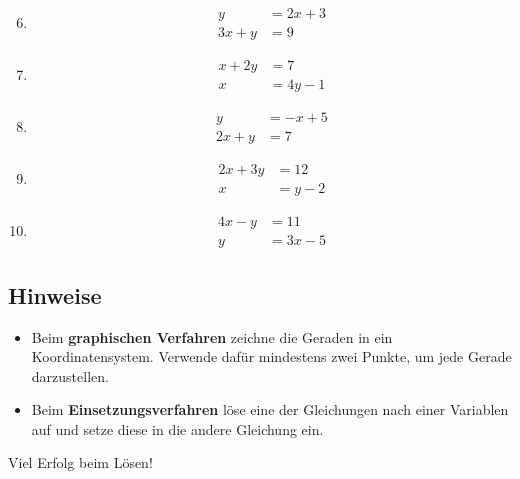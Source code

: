 \begin{enumerate}
    \setcounter{enumi}{5}
    \item
    \[
    \begin{aligned}
    y &= 2x + 3 \\
    3x + y &= 9
    \end{aligned}
    \]

    \item
    \[
    \begin{aligned}
    x + 2y &= 7 \\
    x &= 4y - 1
    \end{aligned}
    \]

    \item
    \[
    \begin{aligned}
    y &= -x + 5 \\
    2x + y &= 7
    \end{aligned}
    \]

    \item
    \[
    \begin{aligned}
    2x + 3y &= 12 \\
    x &= y - 2
    \end{aligned}
    \]

    \item
    \[
    \begin{aligned}
    4x - y &= 11 \\
    y &= 3x - 5
    \end{aligned}
    \]
\end{enumerate}

\subsection*{Hinweise}
\begin{itemize}
    \item Beim \textbf{graphischen Verfahren} zeichne die Geraden in ein Koordinatensystem. Verwende dafür mindestens zwei Punkte, um jede Gerade darzustellen.
    \item Beim \textbf{Einsetzungsverfahren} löse eine der Gleichungen nach einer Variablen auf und setze diese in die andere Gleichung ein.
\end{itemize}

Viel Erfolg beim Lösen!